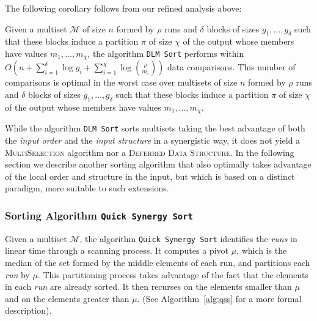 \begin{INUTILE}
The following corollary follows from
our refined analysis above:

  \begin{corollary}
    Given a multiset $\mathcal{M}$ of size $n$ formed by $\rho$ runs
    and $\delta$ blocks of sizes $g_1, \dots, g_{\delta}$ such that
    these blocks induce a partition $\pi$ of size $\chi$ of the output
    whose members have values $m_1, \dots, m_{\chi}$, the algorithm
    {\tt{DLM Sort}} performs within
    $O(n + \sum^{\delta}_{i=1}\log g_i +
    \sum^{\chi}_{i=1}\log{\binom{\rho}{m_i}})$ data comparisons. This
    number of comparisons is optimal in the worst case over multisets
    of size $n$ formed by $\rho$ runs and $\delta$ blocks of sizes
    $g_1, \dots, g_{\delta}$ such that these blocks induce a partition
    $\pi$ of size $\chi$ of the output whose members have values
    $m_1, \dots, m_{\chi}$.
  \end{corollary}
\end{INUTILE}

While the algorithm \texttt{DLM Sort} sorts multisets taking the best
advantage of both the \emph{input order} and the \emph{input
  structure} in a synergistic way, it does not yield a
\textsc{MultiSelection} algorithm nor a \textsc{Deferred Data
  Structure}. In the following section we
describe another sorting algorithm that also optimally takes advantage
of the local order and structure in the input, but which is based on a
distinct paradigm, more suitable to such extensions.

\subsubsection{Sorting Algorithm {\texttt{Quick Synergy
      Sort}}}
\label{sec:qss}

Given a multiset $\mathcal{M}$, the algorithm \texttt{Quick Synergy
  Sort} identifies the \emph{runs} in linear time through a scanning
process. It computes a pivot $\mu$, which is the median
of the set formed by the middle elements of each run, and partitions
each \emph{run} by $\mu$. This partitioning process takes advantage of
the fact that the elements in each \emph{run} are already sorted. It
then recurses on the elements smaller than $\mu$ and on the elements
greater than $\mu$. (See Algorithm~\ref{alg:qss} for a more formal
description).

